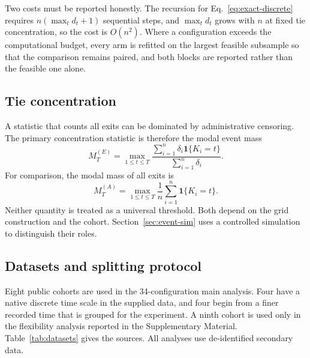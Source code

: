 \documentclass[smallextended,natbib]{svjour3}
\begin{document}
Two costs must be reported honestly. The recursion for Eq.~\eqref{eq:exact-discrete} requires $n\left(\max_t d_t+1\right)$ sequential steps, and $\max_t d_t$ grows with $n$ at fixed tie concentration, so the cost is $O(n^2)$. Where a configuration exceeds the computational budget, every arm is refitted on the largest feasible subsample so that the comparison remains paired, and both blocks are reported rather than the feasible one alone.

\subsection{Tie concentration}
\label{sec:tie-concentration}

A statistic that counts all exits can be dominated by administrative censoring. The primary concentration statistic is therefore the modal event mass
\begin{equation}
M_T^{(E)}=
\max_{1\le t\le T}
\frac{\sum_{i=1}^n\delta_i\mathbf 1\{K_i=t\}}
{\sum_{i=1}^n\delta_i}.
\label{eq:modal-event}
\end{equation}
For comparison, the modal mass of all exits is
\begin{equation}
M_T^{(A)}=
\max_{1\le t\le T}
\frac{1}{n}\sum_{i=1}^n\mathbf 1\{K_i=t\}.
\label{eq:modal-all}
\end{equation}
Neither quantity is treated as a universal threshold. Both depend on the grid construction and the cohort. Section~\ref{sec:event-sim} uses a controlled simulation to distinguish their roles.

\subsection{Datasets and splitting protocol}
\label{sec:data}

Eight public cohorts are used in the 34-configuration main analysis. Four have a native discrete time scale in the supplied data, and four begin from a finer recorded time that is grouped for the experiment. A ninth cohort is used only in the flexibility analysis reported in the Supplementary Material. Table~\ref{tab:datasets} gives the sources. All analyses use de-identified secondary data.
\end{document}
